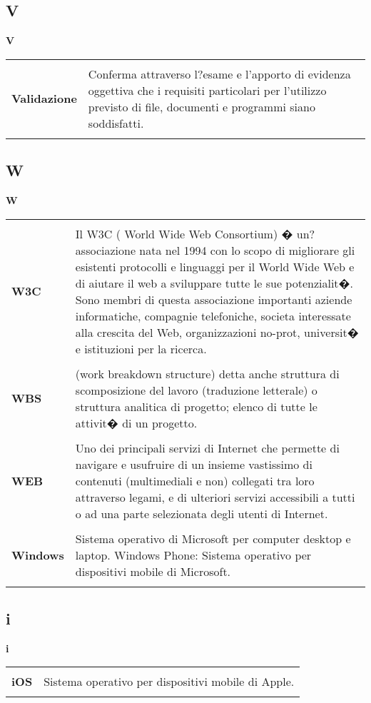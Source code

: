 {\subsection{V} 
\hfill\Huge{\textbf{V}} \\ 
\normalsize 
\begin{longtabu} to 
\toprule \\ 
\textbf{Validazione} & Conferma attraverso l?esame e l'apporto di evidenza oggettiva che i requisiti particolari per l'utilizzo previsto di file, documenti e programmi siano soddisfatti. \\ 
 \\ 
\end{longtabu} 
\newpage 
\subsection{W} 
\hfill\Huge{\textbf{W}} \\ 
\normalsize 
\begin{longtabu} to 
\toprule \\ 
\textbf{W3C} & Il W3C ( World Wide Web Consortium) � un?associazione nata nel 1994 con lo scopo di migliorare gli esistenti protocolli e linguaggi per il World Wide Web e di aiutare il web a sviluppare tutte le sue potenzialit�. Sono membri di questa associazione importanti aziende informatiche, compagnie telefoniche, societa interessate alla crescita del Web, organizzazioni no-prot, universit� e istituzioni per la ricerca. \\ 
 \\ 
\textbf{WBS} & (work breakdown structure) detta anche struttura di scomposizione del lavoro (traduzione letterale) o struttura analitica di progetto; elenco di tutte le attivit� di un progetto. \\ 
 \\ 
\textbf{WEB} & Uno dei principali servizi di Internet che permette di navigare e usufruire di un insieme vastissimo di contenuti (multimediali e non) collegati tra loro attraverso legami, e di ulteriori servizi accessibili a tutti o ad una parte selezionata degli utenti di Internet. \\ 
 \\ 
\textbf{Windows} & Sistema operativo di Microsoft per computer desktop e laptop. Windows Phone: Sistema operativo per dispositivi mobile di Microsoft. \\ 
 \\ 
\end{longtabu} 
\newpage 
\subsection{i} 
\hfill\Huge{\textbf{i}} \\ 
\normalsize 
\begin{longtabu} to 
\toprule \\ 
\textbf{iOS} & Sistema operativo per dispositivi mobile di Apple. \\ 
 \\ 
\end{longtabu} 
 }